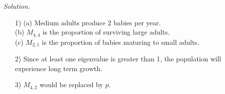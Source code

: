 \documentclass[12pt]{article}
\begin{document}
\textit{Solution.}
\begin{itemize}
\item[1)] (a) Medium adults produce 2 babies per year. \\
		  (b) $M_{4,4}$ is the proportion of surviving large adults. \\
          (c) $M_{2,1}$ is the proportion of babies maturing to small adults.
\item[2)] Since at least one eigenvalue is greater than 1, the population will experience long term growth.
\item[3)] $M_{4,2}$ would be replaced by $p$.
\end{itemize}
\end{document}
